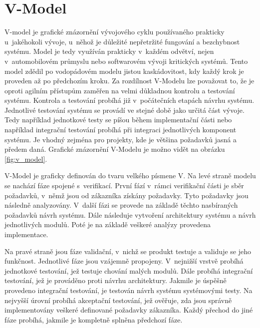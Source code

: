 \documentclass[czech,master]{diploma}
\begin{document}
\section{V-Model}
V-model je grafické znázornění vývojového cyklu používaného prakticky u~jakéhokoli vývoje, u~něhož je důležité nepřetržité fungování a bezchybnost systému. Model je tedy využíván prakticky v~každém odvětví, nejen v~automobilovém průmyslu nebo softwarovém vývoji kritických systémů. Tento model zdědil po vodopádovém modelu jistou kaskádovitost, kdy každý krok je proveden až po předchozím kroku. Za rozdílnost V-Modelu lze považovat to, že je oproti agilním přístupům zaměřen na velmi důkladnou kontrolu a testování systému. Kontrola a testování probíhá již v~počátečních etapách návrhu systému. Jednotlivé testování systému se provádí ve stejné době jako určitá část vývoje. Tedy například jednotkové testy se píšou během implementační části nebo například integrační testování probíhá při integraci jednotlivých komponent systému. Je vhodný zejména pro projekty, kde je většina požadavků jasná a předem daná. Grafické znázornění V-Modelu je možno vidět na obrázku \ref{fig:v_model}.

V-Model je graficky definován do tvaru velkého písmene V. Na levé straně modelu se nachází fáze spojené s~verifikací. První fází v~rámci verifikační části je sběr požadavků, v~němž jsou od zákazníka získány požadavky. Tyto požadavky jsou následně analyzovány. V~další fázi se provede na základě těchto nasbíraných požadavků návrh systému. Dále následuje vytvoření architektury systému a návrh jednotlivých modulů. Poté je na základě veškeré analýzy provedena implementace.

Na pravé straně jsou fáze validační, v~nichž se produkt testuje a validuje se jeho funkčnost. Jednotlivé fáze jsou vzájemně propojeny. V~nejnižší vrstvě probíhá jednotkové testování, jež testuje chování malých modulů. Dále probíhá integrační testování, jež je prováděno proti návrhu architektury. Jakmile je úspěšně provedeno integrační testování, je testován návrh systému systémovými testy. Na nejvyšší úrovní probíhá akceptační testování, jež ověřuje, zda jsou správně implementovány veškeré definované požadavky zákazníka. Každý přechod do jiné fáze probíhá, jakmile je kompletně splněna předchozí fáze.
\end{document}
